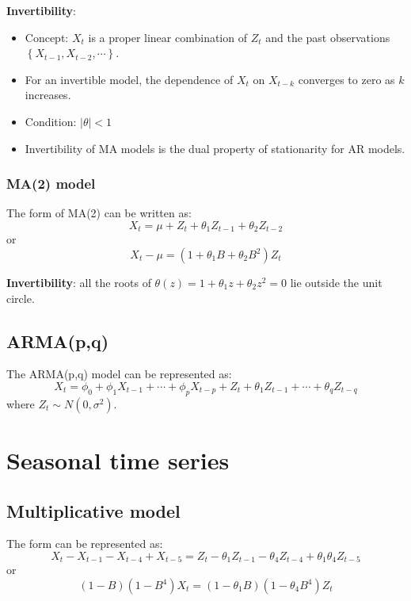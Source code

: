 \documentclass{article}
\begin{document}
\noindent \textbf{Invertibility}:
\begin{itemize}
	\item Concept: $X_t$ is a proper linear combination of $Z_t$ and the past observations $\left\{X_{t-1}, X_{t-2}, \cdots\right\}$.
	
	\item For an invertible model, the dependence of $X_t$ on $X_{t-k}$ converges to zero as $k$ increases.
	
	\item Condition: $|\theta| < 1$
	
	\item Invertibility of MA models is the dual property of stationarity for AR models.
\end{itemize}

\subsubsection{MA(2) model}
The form of MA(2) can be written as:
\begin{equation*}
X_t = \mu + Z_t + \theta_1 Z_{t-1} + \theta_2 Z_{t-2}
\end{equation*}
or
\begin{equation*}
X_t - \mu = (1 + \theta_1 B + \theta_2 B^2) Z_t
\end{equation*}

\noindent \textbf{Invertibility}: all the roots of $\theta(z)=1+\theta_{1} z+\theta_{2} z^{2}=0$ lie outside the unit circle.

\subsection{ARMA(p,q)}
The ARMA(p,q) model can be represented as:
\begin{equation}\label{ARMA1}
X_{t}=\phi_{0}+\phi_{1} X_{t-1}+\cdots+\phi_{p} X_{t-p}+Z_{t}+\theta_{1} Z_{t-1}+\cdots+\theta_{q} Z_{t-q}
\end{equation}
where $Z_t \sim N(0, \sigma^2)$.

\section{Seasonal time series}
\subsection{Multiplicative model}
The form can be represented as:
\begin{equation*}
X_{t}-X_{t-1}-X_{t-4}+X_{t-5}=Z_{t}-\theta_{1} Z_{t-1}-\theta_{4} Z_{t-4}+\theta_{1} \theta_{4} Z_{t-5}
\end{equation*}
or
\begin{equation*}
(1-B)\left(1-B^{4}\right) X_{t}=\left(1-\theta_{1} B\right)\left(1-\theta_{4}B^4\right) Z_{t}
\end{equation*}
\end{document}
